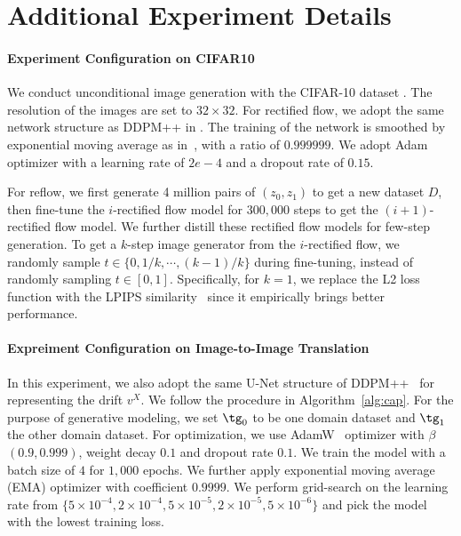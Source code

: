 \documentclass[11pt]{article}
\begin{document}
\section{Additional Experiment Details}
\paragraph{Experiment Configuration on CIFAR10}  We conduct unconditional image generation with the CIFAR-10 dataset \citep{krizhevsky2009learning}. The resolution of the images are set to $32 \times 32$. For rectified flow, we adopt the same network structure as DDPM++ in \citep{song2020score}. The training of the network is smoothed by exponential moving average as in~\citep{song2020score}, with a ratio of $0.999999$. We adopt Adam~\citep{kingma2014adam} optimizer with a learning rate of $2e-4$ and a dropout rate of $0.15$.

For reflow, we first generate 4 million pairs of $(z_0, z_1)$ to get a new dataset $D$, then fine-tune the $i$-rectified flow model for $300,000$ steps to get the $(i+1)$-rectified flow model. We further distill these rectified flow models for few-step generation. To get a $k$-step image generator from the $i$-rectified flow, we randomly sample $t \in \{0, 1/k, \cdots, (k-1)/k\}$ during fine-tuning, instead of randomly sampling $t \in [0, 1]$. Specifically, for $k=1$, we replace the L2 loss function with the LPIPS similarity~\citep{zhang2018unreasonable} since it empirically brings better performance.

\paragraph{Expreiment Configuration on Image-to-Image Translation}
In this experiment, we also adopt the same U-Net structure of DDPM++~\cite{song2020score} for representing the drift $v^X$. 
We follow the procedure in Algorithm~\ref{alg:cap}. 
For the purpose of generative modeling, we set $\tg_0$ to be one domain dataset and $\tg_1$ the other domain dataset. 
For optimization, we use AdamW~\citep{loshchilov2017decoupled} optimizer with $\beta$ $(0.9, 0.999)$, weight decay $0.1$ and dropout rate $0.1$.
We train the model with a batch size of $4$ for $1,000$ epochs. 
We further apply exponential moving average (EMA) optimizer with coefficient $0.9999$.
We perform grid-search on the learning rate from $\{5\times 10^{-4}, 2\times 10^{-4}, 5\times 10^{-5}, 2\times 10^{-5}, 5\times 10^{-6}\}$ and pick the model with the lowest training loss.
\end{document}
